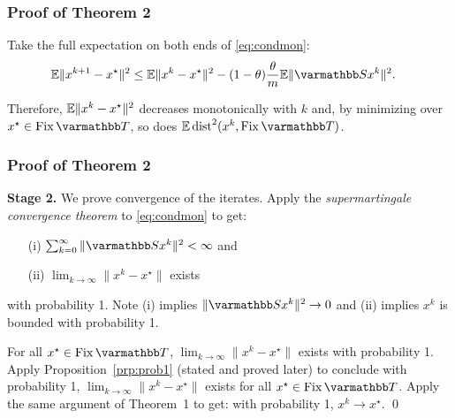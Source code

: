 \documentclass[10pt,mathserif]{beamer}
\begin{document}
\begin{frame}
\frametitle{Proof of Theorem 2}
Take the full expectation on both ends of \eqref{eq:condmon}:
\begin{align*}
  \EE\|x^{k+1} - x^\star\|^2 & \le \EE\|x^{k} - x^\star\|^2 - (1-\theta)\frac{\theta}{m}\EE\|\opS x^{k}\|^2.
\end{align*}
\vspace{0.2in}

Therefore, ${\mathbb{E}}\|x^{k} - x^\star\|^2$ decreases monotonically with $k$ and, by minimizing over $x^\star \in \fix \opT$, so does $\EE \,\dist^2(x^{k},\fix \opT)$.
\end{frame}

\begin{frame}
\frametitle{Proof of Theorem 2}
\textbf{Stage 2.}
We prove convergence of the iterates.
Apply the \emph{supermartingale convergence theorem}
to \eqref{eq:condmon} to get:
\begin{enumerate}
  \item[(i)] $\sum_{k=0}^\infty\|\opS x^k\|^2 < \infty$ and 
  \item[(ii)] $\lim_{k\rightarrow\infty}\|x^k - x^\star\|$ exists
\end{enumerate}
 with probability 1.
Note (i) implies $\|\opS x^k\|^2\rightarrow 0$ and (ii) implies $x^{k}$ is bounded with probability 1.

\vspace{0.2in}\pause
For all $x^\star\in \fix\opT$, $\lim_{k\rightarrow\infty}\|x^k - x^\star\|$ exists with probability 1.
Apply Proposition~\ref{prp:prob1} (stated and proved later) to conclude  with probability 1, $\lim_{k\rightarrow\infty}\|x^k - x^\star\|$ exists for all $x^\star\in \fix \opT$.
Apply the same argument of Theorem~1 to get: with probability 1, $x^k\rightarrow x^\star$.
\qed
\end{frame}
\end{document}
